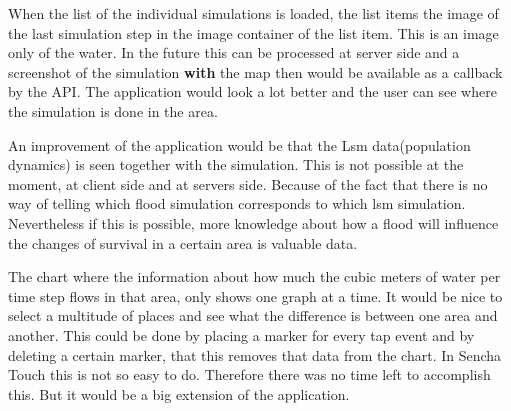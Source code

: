 When the list of the individual simulations is loaded, the list items the image of the last simulation step in the image container of the list item. This is an image only of the water. In the future this can be processed at server side and a screenshot of the simulation \textbf{with} the map then would be available as a callback by the API. The application would look a lot better and the user can see where the simulation is done in the area. 

An improvement of the application would be that the Lsm data(population dynamics) is seen together with the simulation. This is not possible at the moment, at client side and at servers side. Because of the fact that there is no way of telling which flood simulation corresponds to which lsm simulation. Nevertheless if this is possible, more knowledge about how a flood will influence the changes of survival in a certain area is valuable data. 

The chart where the information about how much the cubic meters of water per time step flows in that area, only shows one graph at a time. It would be nice to select a multitude of places and see what the difference is between one area and another. This could be done by placing a marker for every tap event and by deleting a certain marker, that this removes that data from the chart. In Sencha Touch this is not so easy to do. Therefore there was no time left to accomplish this. But it would be a big extension of the application.





